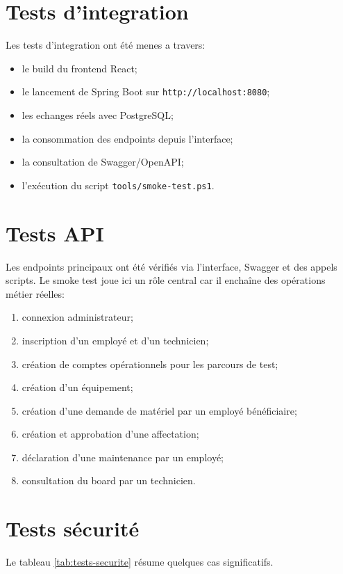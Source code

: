 ﻿\documentclass[12pt,a4paper,oneside]{report}
\begin{document}
\section{Tests d'integration}
Les tests d'integration ont été menes a travers:
\begin{itemize}
  \item le build du frontend React;
  \item le lancement de Spring Boot sur \texttt{http://localhost:8080};
  \item les echanges réels avec PostgreSQL;
  \item la consommation des endpoints depuis l'interface;
  \item la consultation de Swagger/OpenAPI;
  \item l'exécution du script \texttt{tools/smoke-test.ps1}.
\end{itemize}

\section{Tests API}
Les endpoints principaux ont été vérifiés via l'interface, Swagger et des appels scripts. Le smoke test joue ici un rôle central car il enchaîne des opérations métier réelles:
\begin{enumerate}
  \item connexion administrateur;
  \item inscription d'un employé et d'un technicien;
  \item création de comptes opérationnels pour les parcours de test;
  \item création d'un équipement;
  \item création d'une demande de matériel par un employé bénéficiaire;
  \item création et approbation d'une affectation;
  \item déclaration d'une maintenance par un employé;
  \item consultation du board par un technicien.
\end{enumerate}

\section{Tests sécurité}
Le tableau \ref{tab:tests-securite} résume quelques cas significatifs.
\end{document}
